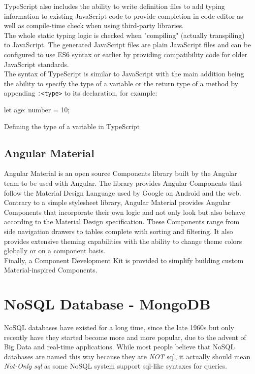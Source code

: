 \documentclass[twoside, openright,11pt,a4paper]{book}
\newenvironment{code}{\captionsetup{type=listing}}{}
\begin{document}
TypeScript also includes the ability to write definition files to add typing information to existing JavaScript code to provide completion in code editor as well as compile-time check when using third-party libraries. \\

The whole static typing logic is checked when "compiling" (actually transpiling) to JavaScript. The generated JavaScript files are plain JavaScript files and can be configured to use ES6 syntax or earlier by providing compatibility code for older JavaScript standards. \\

The syntax of TypeScript is similar to JavaScript with the main addition being the ability to specify the type of a variable or the return type of a method by appending \verb+:<type>+ to its declaration, for example:
\begin{code}
	\begin{inlinets}
let age: number = 10;
	\end{inlinets}
	\caption{Defining the type of a variable in TypeScript}
\end{code}
\subsection{Angular Material}
Angular Material\cite{angular:material:website} is an open source\cite{github:angular:material} Components library built by the Angular team to be used with Angular. The library provides Angular Components that follow the Material Design Language\cite{material:website} used by Google on Android and the web.\\

Contrary to a simple stylesheet library, Angular Material provides Angular Components that incorporate their own logic and not only look but also behave according to the Material Design specification. These Components range from side navigation drawers to tables complete with sorting and filtering. It also provides extensive theming capabilities with the ability to change theme colors globally or on a component basis. \\

Finally, a Component Development Kit is provided to simplify building custom Material-inspired Components.
\section{NoSQL Database - MongoDB}
NoSQL databases\cite{wiki:nosql} have existed for a long time, since the late 1960s but only recently have they started become more and more popular, due to the advent of Big Data and real-time applications. While most people believe that NoSQL databases are named this way because they are \emph{NOT} \gls{sql}, it actually should mean \emph{Not-Only \gls{sql}} as some NoSQL system support \gls{sql}-like syntaxes for queries. \\
\end{document}
